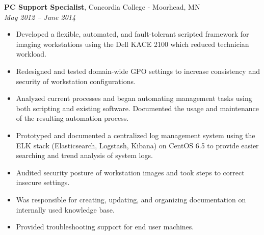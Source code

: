 {\bf PC Support Specialist}, Concordia College - Moorhead, MN\\
{\it May 2012 – June 2014}
\begin{itemize}
	\item Developed a flexible, automated, and fault-tolerant scripted framework for imaging workstations using the Dell KACE 2100 which reduced technician workload.
	\item Redesigned and tested domain-wide GPO settings to increase consistency and security of workstation configurations.
	\item Analyzed current processes and began automating management tasks using both scripting and existing software. Documented the usage and maintenance of the resulting automation process.
	\item Prototyped and documented a centralized log management system using the ELK stack (Elasticsearch, Logstash, Kibana) on CentOS 6.5 to provide easier searching and trend analysis of system logs.
	\item Audited security posture of workstation images and took steps to correct insecure settings.
	\item Was responsible for creating, updating, and organizing documentation on internally used knowledge base.
	\item Provided troubleshooting support for end user machines.
\end{itemize}